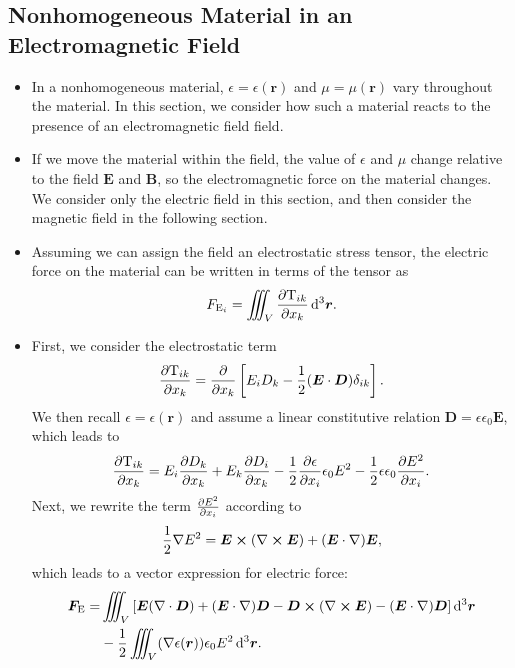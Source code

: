 \documentclass[11pt, a4paper]{article}
\newcommand{\diff}{\mathop{}\!\mathrm{d}} %
\newcommand{\dr}{\diff^{3} \r}  %
\renewcommand{\vec}[1]{\bm{#1}} %
\renewcommand{\r}{\vec{r}}
\newcommand{\E}{\vec{E}} %
\newcommand{\D}{\vec{D}}  %
\newcommand{\B}{\vec{B}} %
\newcommand{\TT}{\mathrm{T}}  %
\newcommand{\e}{\epsilon}
\newcommand{\ee}{\epsilon_{0}}  %
\renewcommand{\div}{\nabla \cdot}
\renewcommand{\curl}{\nabla \cross}
\renewcommand{\grad}{\nabla}
\begin{document}
\subsection{Nonhomogeneous Material in an Electromagnetic Field}
\begin{itemize}
	\item In a nonhomogeneous material, $ \e = \e(\r) $ and $ \mu = \mu(\r) $ vary throughout the material. In this section, we consider how such a material reacts to the presence of an electromagnetic field field.
	
	\item If we move the material within the field, the value of $ \e $ and $ \mu $ change relative to the field $ \E $ and $ \B $, so the electromagnetic force on the material changes. We consider only the electric field in this section, and then consider the magnetic field in the following section.

    \item Assuming we can assign the field an electrostatic stress tensor, the electric force on the material can be written in terms of the tensor as
	\begin{equation*}
		F_{\text{E}_{i}} = \iiint_{V}\pdv{\TT_{ik}}{x_{k}} \dr.
	\end{equation*}
	
	\item First, we consider the electrostatic term
	\begin{equation*}
		\pdv{\TT_{ik}}{x_{k}} = \pdv{x_{k}} \left[ E_{i}D_{k} - \frac{1}{2}(\E \cdot \D) \delta_{ik}\right].
	\end{equation*}
    We then recall $ \e = \e(\r) $ and assume a linear constitutive relation $ \D = \e \ee \E $, which leads to 
	\begin{equation*}
		\pdv{\TT_{ik}}{x_{k}} = E_{i}\pdv{D_{k}}{x_{k}} + E_{k}\pdv{D_{i}}{x_{k}} - \frac{1}{2}\pdv{\e}{x_{i}}\ee E^{2} - \frac{1}{2}\e \ee \pdv{E^{2}}{x_{i}}.
	\end{equation*}
	Next, we rewrite the term $ \pdv{E^{2}}{x_{i}} $ according to
	\begin{equation*}
		\frac{1}{2}\grad E^{2} = \E \cross (\curl \E) + (\E \cdot \grad)\E,
	\end{equation*}
	which leads to a vector expression for electric force:
	\begin{align*}
		\vec{F}_{\text{E}} = &\iiint_{V}\left[\E (\div \D) + (\E \cdot \grad )\D - \D \cross (\curl \E) - (\E \cdot \grad )\D\right] \dr\\
		& - \frac{1}{2}\iiint_{V}(\grad \e(\r))\ee E^{2}\dr.
	\end{align*}
	

\end{itemize}
\end{document}
